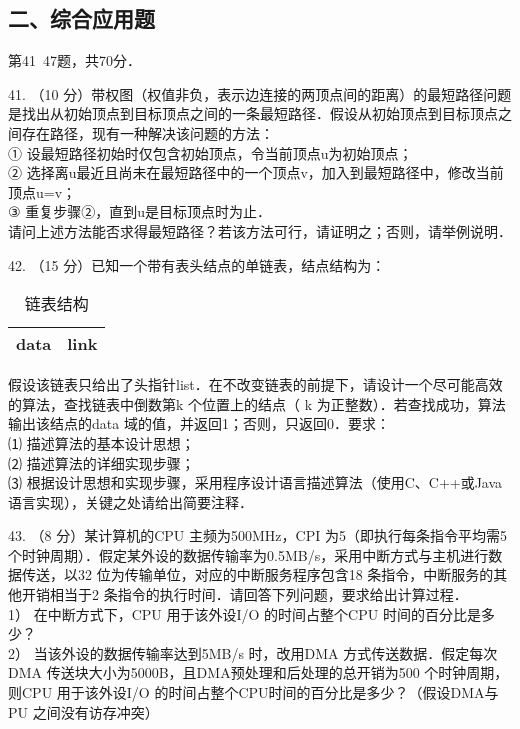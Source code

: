 \subsection{二、综合应用题}
第41~47题，共70分．

41. （10 分）带权图（权值非负，表示边连接的两顶点间的距离）的最短路径问题是找出从初始顶点到目标顶点之间的一条最短路径．假设从初始顶点到目标顶点之间存在路径，现有一种解决该问题的方法： \\
① 设最短路径初始时仅包含初始顶点，令当前顶点u为初始顶点； \\
② 选择离u最近且尚未在最短路径中的一个顶点v，加入到最短路径中，修改当前顶点u=v； \\
③ 重复步骤②，直到u是目标顶点时为止． \\
请问上述方法能否求得最短路径？若该方法可行，请证明之；否则，请举例说明．

42. （15 分）已知一个带有表头结点的单链表，结点结构为：
\begin{table}[ht]
\centering
\caption{链表结构}\label{CSN09_tab1}
\begin{tabular}{|c|c|}
\hline
data & link \\
\hline
\end{tabular}
\end{table}
假设该链表只给出了头指针list．在不改变链表的前提下，请设计一个尽可能高效的算法，查找链表中倒数第k 个位置上的结点（ k 为正整数）．若查找成功，算法输出该结点的data 域的值，并返回1；否则，只返回0．要求： \\
⑴ 描述算法的基本设计思想； \\
⑵ 描述算法的详细实现步骤； \\
⑶ 根据设计思想和实现步骤，采用程序设计语言描述算法（使用C、C++或Java 语言实现），关键之处请给出简要注释．

43. （8 分）某计算机的CPU 主频为500MHz，CPI 为5（即执行每条指令平均需5 个时钟周期）．假定某外设的数据传输率为0.5MB/s，采用中断方式与主机进行数据传送，以32 位为传输单位，对应的中断服务程序包含18 条指令，中断服务的其他开销相当于2 条指令的执行时间．请回答下列问题，要求给出计算过程． \\
1） 在中断方式下，CPU 用于该外设I/O 的时间占整个CPU 时间的百分比是多少？ \\
2） 当该外设的数据传输率达到5MB/s 时，改用DMA 方式传送数据．假定每次DMA 传送块大小为5000B，且DMA预处理和后处理的总开销为500 个时钟周期，则CPU 用于该外设I/O 的时间占整个CPU时间的百分比是多少？（假设DMA与PU 之间没有访存冲突）

